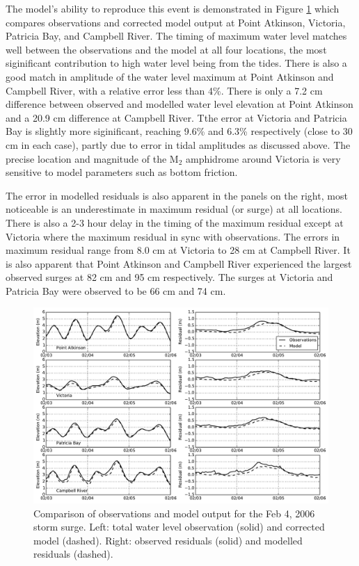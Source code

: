 \documentclass[pdftex,10pt]{article}
\begin{document}
The model's ability to reproduce this event is demonstrated in Figure \ref{fig:feb2006} which compares observations and corrected model output at Point Atkinson, Victoria, Patricia Bay, and Campbell River. The timing of maximum water level matches well between the observations and the model at all four locations, the most siginificant contribution to high water level being from the tides. There is also a good match in amplitude of the water level maximum at Point Atkinson and Campbell River, with a relative error less than 4\%. There is only a 7.2 cm difference between observed and modelled water level elevation at Point Atkinson and a 20.9 cm difference at Campbell River. Tthe error at Victoria and Patricia Bay is slightly more siginificant, reaching 9.6\% and 6.3\% respectively (close to 30 cm in each case), partly due to error in tidal amplitudes as discussed above. The precise location and magnitude of the M$_2$ amphidrome around Victoria is very sensitive to model parameters such as bottom friction. 

The error in modelled residuals is also apparent in the panels on the right, most noticeable is an underestimate in maximum residual (or surge) at all locations. There is also a 2-3 hour delay in the timing of the maximum residual except at Victoria where the maximum residual in sync with observations. The errors in maximum residual range from 8.0 cm at Victoria to 28 cm at Campbell River. It is also apparent that Point Atkinson and Campbell River experienced the largest observed surges at 82 cm and 95 cm respectively. The surges at Victoria and Patricia Bay were observed to be 66 cm and 74 cm. 


\begin{figure}
\centering
\includegraphics[scale=0.6]{Figures/feb2006_bg.pdf}
\caption{Comparison of observations and model output for the Feb 4, 2006 storm surge. Left: total water level observation (solid) and corrected model (dashed). Right: observed residuals (solid) and modelled residuals (dashed).}
\label{fig:feb2006}
\end{figure}
\end{document}
